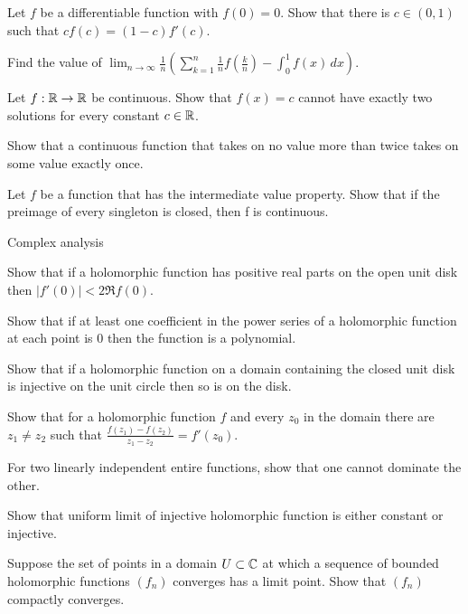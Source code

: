 \documentclass[11pt]{article}
\begin{document}
\begin{cond}
\item Let $f$ be a differentiable function with $f(0)=0$. Show that there is $c\in(0,1)$ such that $cf(c)=(1-c)f'(c)$.
\item Find the value of $\lim_{n\to\infty}\frac1n\left(\sum_{k=1}^n\frac1nf\left(\frac kn\right)-\int_0^1f(x)\,dx\right)$.
\item Let $f:\R\to\R$ be continuous. Show that $f(x)=c$ cannot have exactly two solutions for every constant $c\in\mathbb{R}$.
\item Show that a continuous function that takes on no value more than twice takes on some value exactly once.
\item Let $f$ be a function that has the intermediate value property. Show that if the preimage of every singleton is closed, then f is continuous.
\end{cond}

Complex analysis
\begin{cond}
\item Show that if a holomorphic function has positive real parts on the open unit disk then $|f'(0)|<2\Re f(0)$.
\item Show that if at least one coefficient in the power series of a holomorphic function at each point is 0 then the function is a polynomial.
\item Show that if a holomorphic function on a domain containing the closed unit disk is injective on the unit circle then so is on the disk.
\item Show that for a holomorphic function $f$ and every $z_0$ in the domain there are $z_1\ne z_2$ such that $\frac{f(z_1)-f(z_2)}{z_1-z_2}=f'(z_0)$.
\item For two linearly independent entire functions, show that one cannot dominate the other.
\item Show that uniform limit of injective holomorphic function is either constant or injective.
\item Suppose the set of points in a domain $U\subset\mathbb{C}$ at which a sequence of bounded holomorphic functions $(f_n)$ converges has a limit point. Show that $(f_n)$ compactly converges.
\end{cond}
\clearpage
\end{document}
